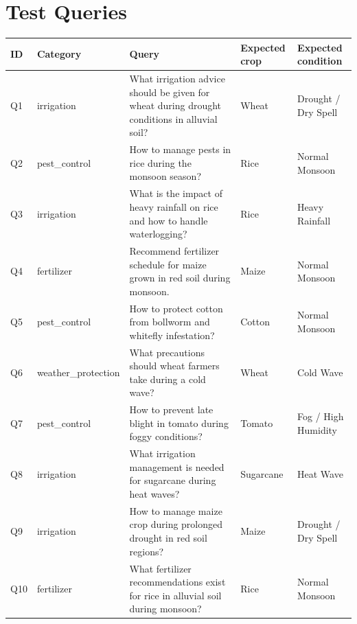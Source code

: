 \documentclass[11pt,a4paper]{article}
\begin{document}
\section{Test Queries}\label{app:queries}
\begin{center}
\scriptsize
\begin{tabular}{@{}llp{}ll@{}}
\toprule
ID & Category & Query & Expected crop & Expected condition \\
\midrule
Q1  & irrigation         & What irrigation advice should be given for wheat during drought conditions in alluvial soil? & Wheat     & Drought / Dry Spell \\
Q2  & pest\_control      & How to manage pests in rice during the monsoon season?                                     & Rice      & Normal Monsoon \\
Q3  & irrigation         & What is the impact of heavy rainfall on rice and how to handle waterlogging?              & Rice      & Heavy Rainfall \\
Q4  & fertilizer         & Recommend fertilizer schedule for maize grown in red soil during monsoon.                 & Maize     & Normal Monsoon \\
Q5  & pest\_control      & How to protect cotton from bollworm and whitefly infestation?                             & Cotton    & Normal Monsoon \\
Q6  & weather\_protection& What precautions should wheat farmers take during a cold wave?                            & Wheat     & Cold Wave \\
Q7  & pest\_control      & How to prevent late blight in tomato during foggy conditions?                             & Tomato    & Fog / High Humidity \\
Q8  & irrigation         & What irrigation management is needed for sugarcane during heat waves?                     & Sugarcane & Heat Wave \\
Q9  & irrigation         & How to manage maize crop during prolonged drought in red soil regions?                    & Maize     & Drought / Dry Spell \\
Q10 & fertilizer         & What fertilizer recommendations exist for rice in alluvial soil during monsoon?           & Rice      & Normal Monsoon \\
\bottomrule
\end{tabular}
\end{center}

\end{document}
